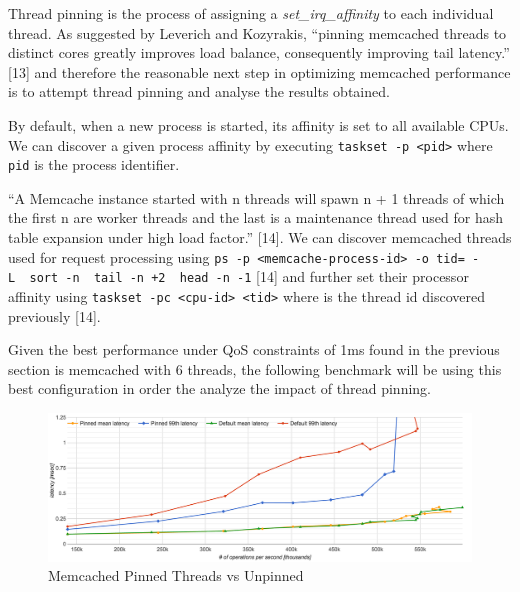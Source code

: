 Thread pinning is the process of assigning a \emph{set\_irq\_affinity}
to each individual thread. As suggested by Leverich and Kozyrakis,
``pinning memcached threads to distinct cores greatly improves load
balance, consequently improving tail latency.'' {[}13{]} and therefore
the reasonable next step in optimizing memcached performance is to
attempt thread pinning and analyse the results obtained.

By default, when a new process is started, its affinity is set to all
available CPUs. We can discover a given process affinity by executing
\texttt{taskset\ -p\ \textless{}pid\textgreater{}} where \texttt{pid} is
the process identifier.

``A Memcache instance started with n threads will spawn n + 1 threads of
which the first n are worker threads and the last is a maintenance
thread used for hash table expansion under high load factor.'' {[}14{]}.
We can discover memcached threads used for request processing using
\texttt{ps\ -p\ \textless{}memcache-process-id\textgreater{}\ -o\ tid=\ -L\ \textbar{}\ sort\ -n\ \textbar{}\ tail\ -n\ +2\ \textbar{}\ head\ -n\ -1}
{[}14{]} and further set their processor affinity using
\texttt{taskset\ -pc\ \textless{}cpu-id\textgreater{}\ \textless{}tid\textgreater{}}
where \emph{} is the thread id discovered previously {[}14{]}.

Given the best performance under QoS constraints of 1ms found in the
previous section is memcached with 6 threads, the following benchmark
will be using this best configuration in order the analyze the impact of
thread pinning.

\begin{figure}[htbp]
\centering
\includegraphics{./res/5_threads_pinned_vs_default.png}
\caption{Memcached Pinned Threads vs Unpinned}
\end{figure}

~

